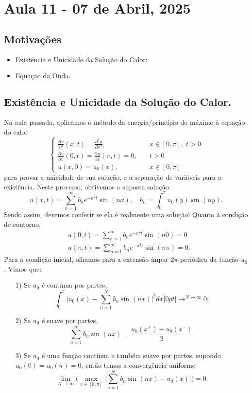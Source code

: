 \documentclass[../pde_notes.tex]{subfiles}
\begin{document}
\section{Aula 11 - 07 de Abril, 2025}
\subsection{Motivações}
\begin{itemize}
	\item Existência e Unicidade da Solução do Calor;
	\item Equação da Onda.
\end{itemize}
\subsection{Existência e Unicidade da Solução do Calor.}
Na aula passada, aplicamos o método da energia/princípio do máximo à equação do calor
\[
	\left\{\begin{array}{ll}
		\frac{\partial^{}u}{\partial t^{}}(x, t) = \frac{\partial^{2}u}{\partial x^{2}},            & \quad x\in[0, \pi ],\; t>0 \\
		\frac{\partial^{}u}{\partial x^{}}(0, t) = \frac{\partial^{}u}{\partial x^{}}(\pi , t) = 0, & \quad t>0                  \\
		u(x, 0) = u_{0}(x),                                                                         & \quad x\in [0, \pi ]
	\end{array}\right.
\]
para provar a unicidade de sua solução, e a separação de variáveis para a existência. Neste processo, obtivemos a suposta solução
\[
	u(x, t) = \sum\limits_{n=1}^{\infty}b_{n}e^{-n^{2}t}\sin^{}{(nx)},\quad b_{n} = \int_{0}^{\pi }u_{0}(y)\sin^{}{(ny)}.
\]
Sendo assim, devemos conferir se ela é realmente uma solução! Quanto à condição de contorno,
\begin{align*}
	 & u(0, t) = \sum\limits_{n=1}^{\infty}b_{n}e^{-n^{2}t}\sin^{}{(n0)} = 0        \\
	 & u(\pi , t) = \sum\limits_{n=1}^{\infty}b_{n}e^{-n^{2}t}\sin^{}{(n\pi )} = 0.
\end{align*}
Para a condição inicial, olhamos para a extensão ímpar \(2\pi \)-periódica da função \(u_{0}\). Vimos que:
\begin{itemize}
	\item[1)] Se \(u_{0}\) é contínua por partes,
	      \[
		      \int_{0}^{\pi }\biggl\vert u_{0}(x) - \sum\limits_{n=1}^{N}b_{n}\sin^{}{(nx)} \biggr\vert^{2}dx \overbracket[0pt]{\longrightarrow}^{N\to \infty}0;
	      \]
	\item[2)] Se \(u_{0}\) é suave por partes,
	      \[
		      \sum\limits_{n=1}^{\infty}b_{n}\sin^{}{(nx)} = \frac{u_{0}(x^{+}) + u_{0}(x^{-})}{2}.
	      \]
	\item[3)] Se \(u_{0}\) é uma função contínua e também suave por partes, supondo \(u_{0}(0) = u_{0}(\pi ) = 0\), então temos a convergência uniforme
	      \[
		      \lim_{N\to \infty}\biggl(\max_{x\in [0, \pi ]}\biggl\vert \sum\limits_{n=1}^{N}b_{n}\sin^{}{(nx)}-u_{0}(x) \biggr\vert\biggr) = 0.
	      \]
\end{itemize}
\end{document}
